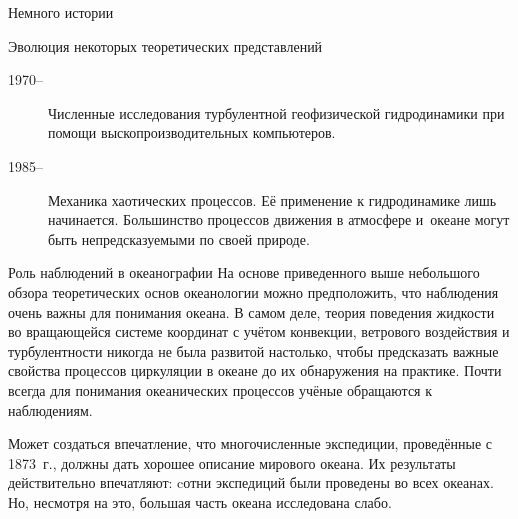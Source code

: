 \begin{chapter}{Немного истории}
\begin{section}{Эволюция некоторых теоретических представлений}
\begin{description}
\item[1970--] Численные исследования турбулентной геофизической
гидродинамики при помощи выскопроизводительных компьютеров.
%


\item[1985--] Механика хаотических процессов. Её применение к
гидродинамике лишь начинается. Большинство процессов движения в атмосфере 
и~океане могут быть непредсказуемыми по своей природе.
%
\end{description}
\end{section}

\begin{section}{Роль наблюдений в океанографии}
На основе приведенного выше небольшого обзора теоретических основ океанологии
можно предположить, что наблюдения очень важны для понимания океана. В самом
деле, теория поведения жидкости во вращающейся системе координат с учётом 
конвекции, ветрового воздействия и турбулентности никогда не была развитой
настолько, чтобы предсказать важные свойства процессов циркуляции в океане 
до их обнаружения на практике. Почти всегда для понимания океанических 
процессов учёные обращаются к наблюдениям.
%

Может создаться впечатление, что многочисленные экспедиции, проведённые 
с 1873~г., должны дать хорошее описание мирового океана. Их результаты 
действительно впечатляют: cотни экспедиций были проведены во всех океанах. 
Но, несмотря на это, большая часть океана исследована слабо.
%


\end{section}
\end{chapter}
